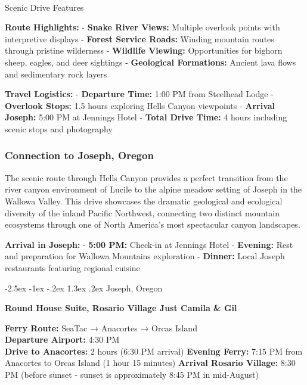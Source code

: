 \documentclass[
  11pt,
  letterpaper,
  DIV=10,
  numbers=noendperiod]{scrartcl}
\makeatletter
\let\oldparagraph\paragraph
\renewcommand{\paragraph}{
    \@ifstar
      \xxxParagraphStar
      \xxxParagraphNoStar
  }
\newcommand{\xxxParagraphStar}[1]{\oldparagraph*{#1}\mbox{}}
\newcommand{\xxxParagraphNoStar}[1]{\oldparagraph{#1}\mbox{}}
\renewcommand{\section}{\@startsection{section}{1}{\z@}%
  {-2.5ex \@plus -1ex \@minus -.2ex}%
  {1.3ex \@plus .2ex}%
  {\normalfont\fontsize{16}{19}\bfseries\color{twinpeaksred}}}
\makeatother
\begin{document}
\paragraph{Scenic Drive Features}\label{scenic-drive-features}

\textbf{Route Highlights:} - \textbf{Snake River Views:} Multiple
overlook points with interpretive displays - \textbf{Forest Service
Roads:} Winding mountain routes through pristine wilderness -
\textbf{Wildlife Viewing:} Opportunities for bighorn sheep, eagles, and
deer sightings - \textbf{Geological Formations:} Ancient lava flows and
sedimentary rock layers

\textbf{Travel Logistics:} - \textbf{Departure Time:} 1:00 PM from
Steelhead Lodge - \textbf{Overlook Stops:} 1.5 hours exploring Hells
Canyon viewpoints - \textbf{Arrival Joseph:} 5:00 PM at Jennings Hotel -
\textbf{Total Drive Time:} 4 hours including scenic stops and
photography

\subsubsection{Connection to Joseph,
Oregon}\label{connection-to-joseph-oregon}

The scenic route through Hells Canyon provides a perfect transition from
the river canyon environment of Lucile to the alpine meadow setting of
Joseph in the Wallowa Valley. This drive showcases the dramatic
geological and ecological diversity of the inland Pacific Northwest,
connecting two distinct mountain ecosystems through one of North
America's most spectacular canyon landscapes.

\textbf{Arrival in Joseph:} - \textbf{5:00 PM:} Check-in at Jennings
Hotel - \textbf{Evening:} Rest and preparation for Wallowa Mountains
exploration - \textbf{Dinner:} Local Joseph restaurants featuring
regional cuisine

\newpage

\section{Joseph, Oregon}\label{joseph-oregon-1}

\textbf{Round House Suite, Rosario Village \textbar{} Just Camila \&
Gil}

\textbf{Ferry Route:} SeaTac → Anacortes → Orcas Island\\
\textbf{Departure Airport:} 4:30 PM\\
\textbf{Drive to Anacortes:} 2 hours (6:30 PM arrival) \textbf{Evening
Ferry:} 7:15 PM from Anacortes to Orcas Island (1 hour 15 minutes)
\textbf{Arrival Rosario Village:} 8:30 PM (before sunset - sunset is
approximately 8:45 PM in mid-August)
\end{document}
